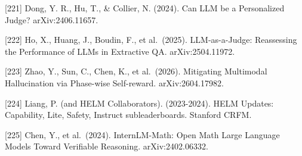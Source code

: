 {[}221{]} Dong, Y. R., Hu, T., \& Collier, N. (2024). Can LLM be a Personalized Judge? arXiv:2406.11657.

{[}222{]} Ho, X., Huang, J., Boudin, F., et al.~(2025). LLM-as-a-Judge: Reassessing the Performance of LLMs in Extractive QA. arXiv:2504.11972.

{[}223{]} Zhao, Y., Sun, C., Chen, K., et al.~(2026). Mitigating Multimodal Hallucination via Phase-wise Self-reward. arXiv:2604.17982.

{[}224{]} Liang, P. (and HELM Collaborators). (2023-2024). HELM Updates: Capability, Lite, Safety, Instruct subleaderboards. Stanford CRFM.

{[}225{]} Chen, Y., et al.~(2024). InternLM-Math: Open Math Large Language Models Toward Verifiable Reasoning. arXiv:2402.06332.
